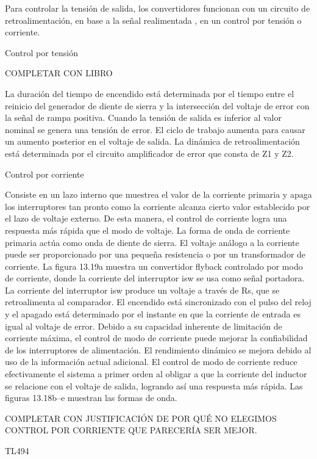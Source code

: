 Para controlar la tensión de salida, los convertidores funcionan con un circuito de retroalimentación,
 en base a la señal realimentada , en un control por tensión o corriente.

Control por tensión

COMPLETAR CON LIBRO

La duración del tiempo de encendido está determinada por el tiempo entre el reinicio del generador de diente de sierra
 y la intersección del voltaje de error con la señal de rampa positiva. 
 Cuando la tensión de salida es inferior al valor nominal se genera una tensión de error. 
 El ciclo de trabajo aumenta para causar un aumento posterior en el voltaje de salida. 
 La dinámica de retroalimentación está determinada por el circuito amplificador de error que consta de Z1 y Z2.



 Control por corriente 

 Consiste en un lazo interno que muestrea el valor de la corriente primaria y apaga los interruptores tan pronto como la corriente alcanza cierto valor establecido por el lazo de voltaje externo. 
 De esta manera, el control de corriente logra una respuesta más rápida que el modo de voltaje. 
 La forma de onda de corriente primaria actúa como onda de diente de sierra. 
 El voltaje análogo a la corriente puede ser proporcionado por una pequeña resistencia o por un transformador de corriente. 
 La figura 13.19a muestra un convertidor flyback controlado por modo de corriente, donde la corriente del interruptor isw se usa como señal portadora. 
 La corriente del interruptor isw produce un voltaje a través de Rs, que se retroalimenta al comparador. 
 El encendido está sincronizado con el pulso del reloj y el apagado está determinado por el instante en que la corriente de entrada es igual al voltaje de error.
 Debido a su capacidad inherente de limitación de corriente máxima, el control de modo de corriente puede mejorar la confiabilidad de los interruptores de alimentación. El rendimiento dinámico se mejora debido al uso de la información actual adicional. El control de modo de corriente reduce efectivamente el sistema a primer orden al obligar a que la corriente del inductor se relacione con el voltaje de salida, logrando así una respuesta más rápida. Las figuras 13.18b–e muestran las formas de onda.

 COMPLETAR CON JUSTIFICACIÓN DE POR QUÉ NO ELEGIMOS CONTROL POR CORRIENTE QUE PARECERÍA SER MEJOR. 

 TL494 

